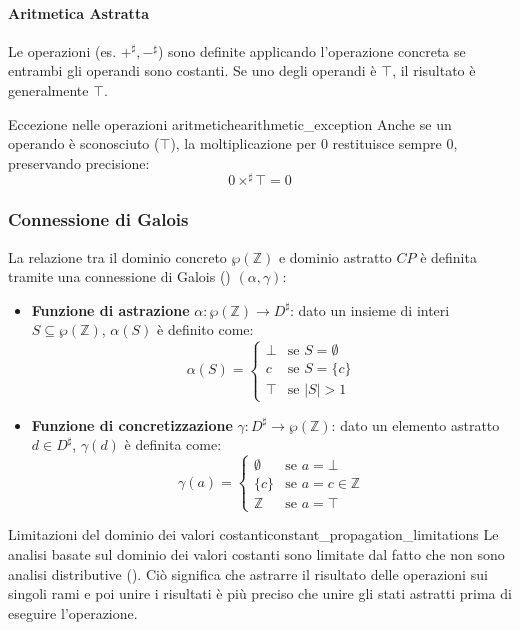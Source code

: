 \paragraph{Aritmetica Astratta}
Le operazioni (es. $+^\sharp, -^\sharp$) sono definite applicando l'operazione concreta se entrambi gli operandi sono costanti. Se uno degli operandi è $\top$, il risultato è generalmente $\top$.

\begin{nota}{Eccezione nelle operazioni aritmetiche}{arithmetic_exception}
 Anche se un operando è sconosciuto ($\top$), la moltiplicazione per $0$
 restituisce sempre $0$, preservando precisione:
\begin{equation}
    0 \times^\sharp \top = 0
\end{equation}
\end{nota}

\subsubsection{Connessione di Galois}
La relazione tra il dominio concreto $\wp(\mathbb{Z})$ e dominio astratto $CP$
è definita tramite una connessione di Galois ()
$(\alpha, \gamma)$:
\begin{itemize}
    \item \textbf{Funzione di astrazione} $\alpha: \wp(\mathbb{Z}) \to D^\sharp$:
    dato un insieme di interi $S \subseteq \wp(\mathbb{Z})$, $\alpha(S)$ è
    definito come:
    \[
    \alpha(S) =
    \begin{cases}
        \bot & \text{se } S = \emptyset \\
        c & \text{se } S = \{c\} \\
        \top & \text{se } |S| > 1
    \end{cases}
    \]
    \item \textbf{Funzione di concretizzazione} $\gamma: D^\sharp \to \wp(\mathbb{Z})$:
    dato un elemento astratto $d \in D^\sharp$, $\gamma(d)$ è definita come:
    \[
    \gamma(a) =
    \begin{cases}
        \emptyset & \text{se } a = \bot \\
        \{c\} & \text{se } a = c \in \mathbb{Z} \\
        \mathbb{Z} & \text{se } a = \top
    \end{cases}
    \]
\end{itemize}

\begin{nota}{Limitazioni del dominio dei valori costanti}{constant_propagation_limitations}
Le analisi basate sul dominio dei valori costanti sono limitate dal fatto che
non sono analisi distributive ().
Ciò significa che astrarre il risultato delle operazioni sui singoli rami e
poi unire i risultati è più preciso che unire gli stati astratti prima di
eseguire l'operazione.
\end{nota}

